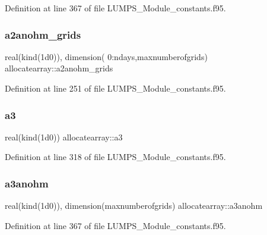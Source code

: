 Definition at line 367 of file L\+U\+M\+P\+S\+\_\+\+Module\+\_\+constants.\+f95.

\mbox{\label{namespaceallocatearray_acf7a96adc3b69c60d4ce6e7dfc650d84}} 
\subsubsection{\texorpdfstring{a2anohm\+\_\+grids}{a2anohm\_grids}}
{\footnotesize\ttfamily real(kind(1d0)), dimension( 0\+:ndays,maxnumberofgrids) allocatearray\+::a2anohm\+\_\+grids}



Definition at line 251 of file L\+U\+M\+P\+S\+\_\+\+Module\+\_\+constants.\+f95.

\mbox{\label{namespaceallocatearray_ac17d9365b9163e951de7ce3f5fa21897}} 
\subsubsection{\texorpdfstring{a3}{a3}}
{\footnotesize\ttfamily real(kind(1d0)) allocatearray\+::a3}



Definition at line 318 of file L\+U\+M\+P\+S\+\_\+\+Module\+\_\+constants.\+f95.

\mbox{\label{namespaceallocatearray_ae979608ee97f9eb1ab20cfd2bef838db}} 
\subsubsection{\texorpdfstring{a3anohm}{a3anohm}}
{\footnotesize\ttfamily real(kind(1d0)), dimension(maxnumberofgrids) allocatearray\+::a3anohm}



Definition at line 367 of file L\+U\+M\+P\+S\+\_\+\+Module\+\_\+constants.\+f95.

\mbox{\label{namespaceallocatearray_a2b748c97acf1e59645afb30c49a9ef9a}} 
